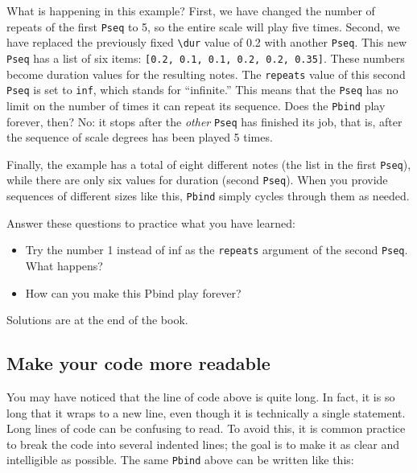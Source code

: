 What is happening in this example? First, we have changed the number of repeats of the first \texttt{Pseq} to 5, so the entire scale will play five times. Second, we have replaced the previously fixed \texttt{\textbackslash dur} value of 0.2 with another \texttt{Pseq}. This new \texttt{Pseq} has a list of six items: \texttt{[0.2, 0.1, 0.1, 0.2, 0.2, 0.35]}. These numbers become duration values for the resulting notes. The \texttt{repeats} value of this second \texttt{Pseq} is set to \texttt{inf}, which stands for ``infinite.'' This means that the \texttt{Pseq} has no limit on the number of times it can repeat its sequence. Does the \texttt{Pbind} play forever, then? No: it stops after the \emph{other} \texttt{Pseq} has finished its job, that is, after the sequence of scale degrees has been played 5 times.

Finally, the example has a total of eight different notes (the list in the first \texttt{Pseq}), while there are only six values for duration (second \texttt{Pseq}). When you provide sequences of different sizes like this, \texttt{Pbind} simply cycles through them as needed.

Answer these questions to practice what you have learned:
\begin{itemize}
\item Try the number 1 instead of inf as the \texttt{repeats} argument of the second \texttt{Pseq}. What happens?
\item How can you make this Pbind play forever?
\end{itemize}

Solutions are at the end of the book.

\subsection{Make your code more readable}

You may have noticed that the line of code above is quite long. In fact, it is so long that it wraps to a new line, even though it is technically a single statement. Long lines of code can be confusing to read. To avoid this, it is common practice to break the code into several indented lines; the goal is to make it as clear and intelligible as possible. The same \texttt{Pbind} above can be written like this:

